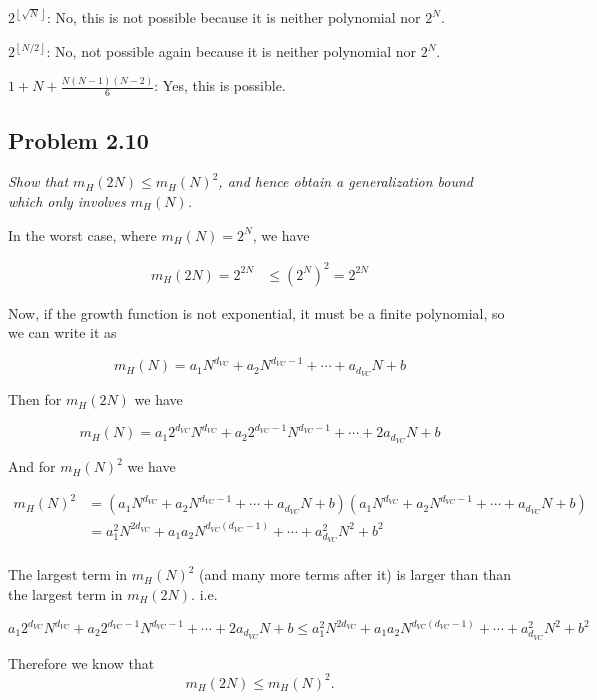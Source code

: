 \documentclass{article}
\newcommand{\floor}[1]{\left\lfloor #1 \right\rfloor}
\begin{document}
$2^{\floor{\sqrt{N}}}$: No, this is not possible because it is neither polynomial nor $2^N$.

\smallskip

$2^{\floor{N/2}}$: No, not possible again because it is neither polynomial nor $2^N$.

\smallskip

$1+N+\frac{N(N-1)(N-2)}{6}$: Yes, this is possible.



\subsection*{Problem 2.10}

\textit{Show that $m_H(2N) \leq m_H(N)^2$, and hence obtain a generalization bound which 
only involves $m_H(N)$.}

  In the worst case, where $m_H(N) = 2^N$, we have

  \begin{align*}
    m_H(2N) = 2^{2N} &\leq (2^N)^2 = 2^{2N}
  \end{align*}
  
  Now, if the growth function is not exponential, it must be a finite polynomial, so we can write it
  as

  $$m_H(N) = a_1N^{d_{VC}} + a_2N^{d_{VC}-1} + \cdots + a_{d_{VC}}N + b$$

  Then for $m_H(2N)$ we have

  $$m_H(N) = a_1 2^{d_{VC}} N^{d_{VC}} + a_2 2^{d_{VC}-1} N^{d_{VC}-1} + \cdots + 2 a_{d_{VC}}N + b$$

  And for $m_H(N)^2$ we have

  \begin{align*}
    m_H(N)^2 &= (a_1N^{d_{VC}} + a_2N^{d_{VC}-1} + \cdots + a_{d_{VC}}N + b)(a_1N^{d_{VC}} + a_2N^{d_{VC}-1} + \cdots + a_{d_{VC}}N + b) \\
    &= a_1^2N^{2d_{VC}} + a_1a_2N^{d_{VC}(d_{VC}-1)} + \cdots + a_{d_{VC}}^2N^2 + b^2 \\
  \end{align*}

  The largest term in $m_H(N)^2$ (and many more terms after it) is larger than than the largest term
  in $m_H(2N)$. i.e.

  $$a_1 2^{d_{VC}} N^{d_{VC}} + a_2 2^{d_{VC}-1} N^{d_{VC}-1} + \cdots + 2 a_{d_{VC}}N + b \leq a_1^2N^{2d_{VC}} + a_1a_2N^{d_{VC}(d_{VC}-1)} + \cdots + a_{d_{VC}}^2N^2 + b^2$$

  Therefore we know that $$m_H(2N) \leq m_H(N)^2.$$
\end{document}
